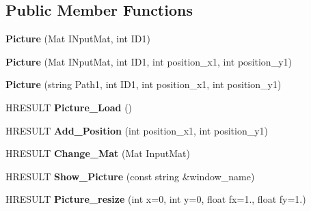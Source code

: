 \subsection*{Public Member Functions}
\begin{DoxyCompactItemize}
\item 
\mbox{\label{class_mywebcam_1_1_picture_a0ee63c5080487342c6a6117d19f811d6}} 
{\bfseries Picture} (Mat I\+Nput\+Mat, int I\+D1)
\item 
\mbox{\label{class_mywebcam_1_1_picture_a353dd5d56bc7d1bfba5c67ad312f3109}} 
{\bfseries Picture} (Mat I\+Nput\+Mat, int I\+D1, int position\+\_\+x1, int position\+\_\+y1)
\item 
\mbox{\label{class_mywebcam_1_1_picture_a8ef6f8890b01ad9283a6e91530207e25}} 
{\bfseries Picture} (string Path1, int I\+D1, int position\+\_\+x1, int position\+\_\+y1)
\item 
\mbox{\label{class_mywebcam_1_1_picture_a043564b14f276e73e1ad1cd8b19b4fc2}} 
H\+R\+E\+S\+U\+LT {\bfseries Picture\+\_\+\+Load} ()
\item 
\mbox{\label{class_mywebcam_1_1_picture_a2275a784b55b76a39cf02d3bb6145375}} 
H\+R\+E\+S\+U\+LT {\bfseries Add\+\_\+\+Position} (int position\+\_\+x1, int position\+\_\+y1)
\item 
\mbox{\label{class_mywebcam_1_1_picture_a9512aa657c512552c6360931d91a3866}} 
H\+R\+E\+S\+U\+LT {\bfseries Change\+\_\+\+Mat} (Mat Input\+Mat)
\item 
\mbox{\label{class_mywebcam_1_1_picture_abb2774b983bf05a6f9eea99278263f93}} 
H\+R\+E\+S\+U\+LT {\bfseries Show\+\_\+\+Picture} (const string \&window\+\_\+name)
\item 
\mbox{\label{class_mywebcam_1_1_picture_a8f64b98e5c7216970ec298b375aea88b}} 
H\+R\+E\+S\+U\+LT {\bfseries Picture\+\_\+resize} (int x=0, int y=0, float fx=1., float fy=1.)
\item 
\mbox{\label{class_mywebcam_1_1_picture_ad7ace3eb1a14bffd5311ec236f8eaf37}} 

\end{DoxyCompactItemize}
